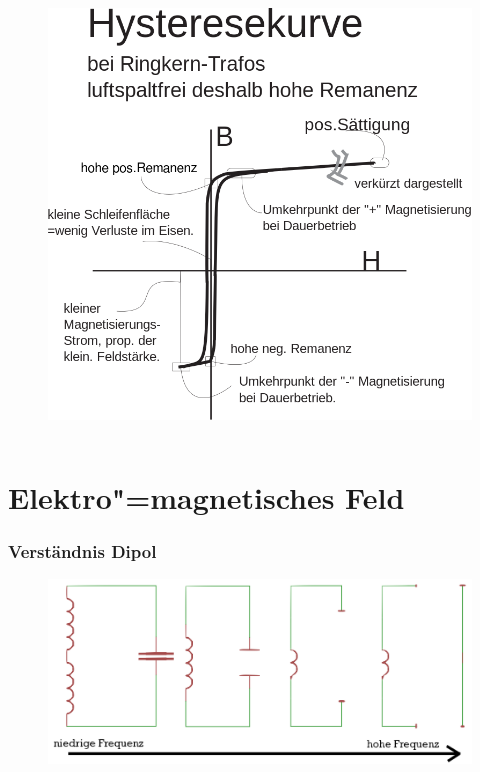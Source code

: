 \begin{frame}
\begin{columns}[t]
\begin{center}
\begin{figure}
        \includegraphics[width=1\textwidth,height=.6\textheight,keepaspectratio]{a08/Hard_hysteresis_de.png}
      \end{figure}
    \end{center}
  \end{columns}
\end{frame}

\section*{Elektro"=magnetisches Feld}

\begin{frame}
  \frametitle{Verständnis Dipol}
  \begin{center}
    \begin{figure}
      \includegraphics[width=1\textwidth,height=.85\textheight,keepaspectratio]{a08/dipol_entstehung.png}
    \end{figure}
  \end{center}
\end{frame}

